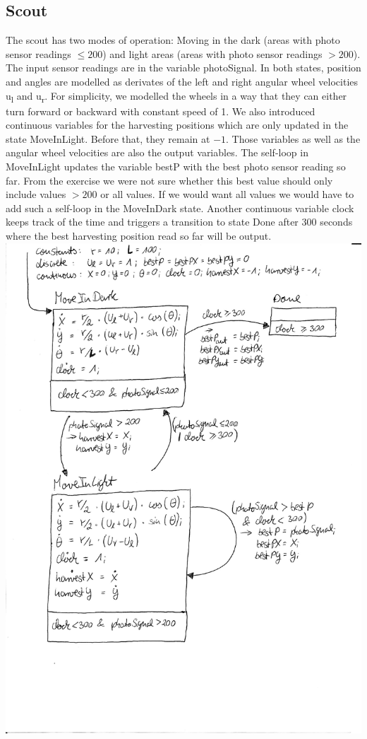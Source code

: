 \documentclass[12pt]{article}
\begin{document}
\subsection* {Scout}
The scout has two modes of operation: Moving in the dark (areas with photo sensor readings $\leq 200$) and light areas (areas with photo sensor readings $> 200$). The input sensor readings are in the variable photoSignal. In both states, position and angles are modelled as derivates of the left and right angular wheel velocities u\textsubscript{l} and u\textsubscript{r}. For simplicity, we modelled the wheels in a way that they can either turn forward or backward with constant speed of 1. We also introduced continuous variables for the harvesting positions which are only updated in the state MoveInLight. Before that, they remain at $-1$. Those variables as well as the angular wheel velocities are also the output variables. The self-loop in MoveInLight updates the variable bestP with the best photo sensor reading so far. From the exercise we were not sure whether this best value should only include values $> 200$ or all values. If we would want all values we would have to add such a self-loop in the MoveInDark state. Another continuous variable clock keeps track of the time and triggers a transition to state Done after 300 seconds where the best harvesting position read so far will be output.\\
\includegraphics[scale = 0.8]{pictures/hybrid_automata_scout}
\end{document}

